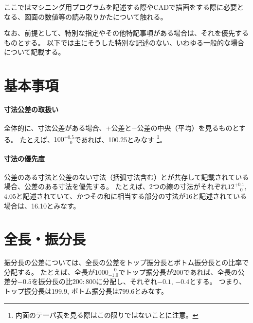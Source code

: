 
ここではマシニング用プログラムを記述する際やCADで描画をする際に必要となる、図面の数値等の読み取りかたについて触れる。

なお、前提として、特別な指定やその他特記事項がある場合は、それを優先するものとする。
以下では主にそうした特別な記述のない、いわゆる一般的な場合について記載する。




\section{基本事項}
\paragraph{寸法公差の取扱い}\noindent
全体的に、寸法公差がある場合、$+$公差と$-$公差の中央（平均）を見るものとする。
たとえば、$100^{+0.5}_{\phantom -0}$であれば、100.25とみなす
\footnote{内面のテーパ表を見る際はこの限りではないことに注意。}。

\paragraph{寸法の優先度}\noindent
公差のある寸法と公差のない寸法（括弧寸法含む）とが共存して記載されている場合、公差のある寸法を優先する。
たとえば、2つの線の寸法がそれぞれ$12^{+0.1}_{\phantom -0}$, $4.05$と記述されていて、かつその和に相当する部分の寸法が16と記述されている場合は、16.10とみなす。




\section{全長・振分長}
振分長の公差については、全長の公差をトップ振分長とボトム振分長との比率で分配する。
たとえば、全長が$1000^{\phantom +0}_{-1.0}$でトップ振分長が200であれば、全長の公差分$-0.5$を振分長の比$200:800$に分配し、それぞれ$-0.1$, $-0.4$とする。
つまり、トップ振分長は199.9, ボトム振分長は799.6とみなす。

